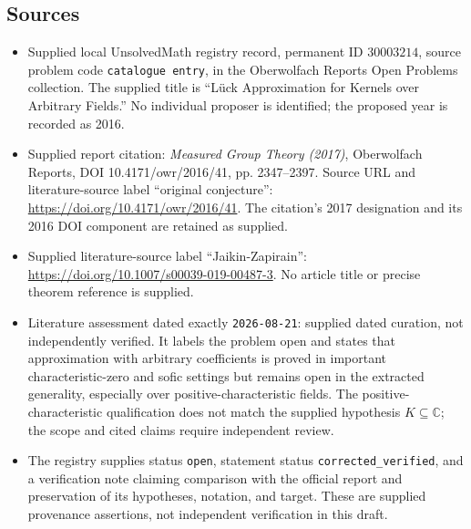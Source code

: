 \documentclass[11pt]{article}
\newcommand{\C}{\mathbb{C}}
\begin{document}
\subsection{Sources}
\begin{itemize}
\item Supplied local UnsolvedMath registry record, permanent ID \(30003214\), source problem code \texttt{catalogue entry}, in the Oberwolfach Reports Open Problems collection. The supplied title is ``Lück Approximation for Kernels over Arbitrary Fields.'' No individual proposer is identified; the proposed year is recorded as 2016.
\item Supplied report citation: \emph{Measured Group Theory (2017)}, Oberwolfach Reports, DOI 10.4171/owr/2016/41, pp. 2347--2397. Source URL and literature-source label ``original conjecture'': \url{https://doi.org/10.4171/owr/2016/41}. The citation's 2017 designation and its 2016 DOI component are retained as supplied.
\item Supplied literature-source label ``Jaikin-Zapirain'': \url{https://doi.org/10.1007/s00039-019-00487-3}. No article title or precise theorem reference is supplied.
\item Literature assessment dated exactly \texttt{2026-08-21}: supplied dated curation, not independently verified. It labels the problem open and states that approximation with arbitrary coefficients is proved in important characteristic-zero and sofic settings but remains open in the extracted generality, especially over positive-characteristic fields. The positive-characteristic qualification does not match the supplied hypothesis \(K\subseteq\C\); the scope and cited claims require independent review.
\item The registry supplies status \texttt{open}, statement status \texttt{corrected\_verified}, and a verification note claiming comparison with the official report and preservation of its hypotheses, notation, and target. These are supplied provenance assertions, not independent verification in this draft.
\end{itemize}
\end{document}

